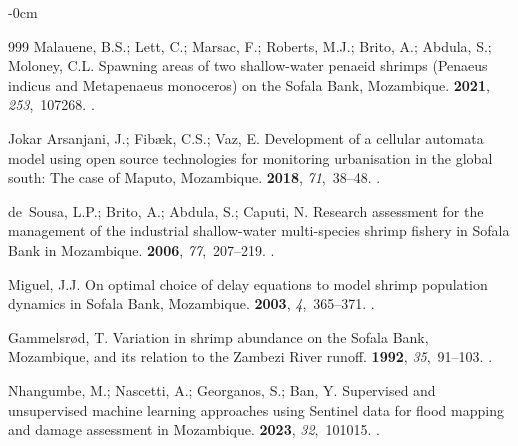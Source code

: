 \documentclass[coasts,article,accept,pdftex,oneauthor]{Definitions/mdpi}
\begin{document}
\begin{adjustwidth}{-\extralength}{0cm}
\begin{thebibliography}{999}
Malauene, B.S.; Lett, C.; Marsac, F.; Roberts, M.J.; Brito, A.; Abdula, S.;
  Moloney, C.L.
\newblock Spawning areas of two shallow-water penaeid shrimps (Penaeus indicus
  and Metapenaeus monoceros) on the Sofala Bank, Mozambique.
 {\bf 2021}, {\em
  253},~107268.
.

{Jokar Arsanjani}, J.; Fibæk, C.S.; Vaz, E.
\newblock Development of a cellular automata model using open source
  technologies for monitoring urbanisation in the global south: The case of
  Maputo, Mozambique.
 {\bf 2018}, {\em 71},~38--48.
.

de~Sousa, L.P.; Brito, A.; Abdula, S.; Caputi, N.
\newblock Research assessment for the management of the industrial
  shallow-water multi-species shrimp fishery in Sofala Bank in Mozambique.
 {\bf 2006}, {\em 77},~207--219.
.

Miguel, J.J.
\newblock On optimal choice of delay equations to model shrimp population
  dynamics in Sofala Bank, Mozambique.
 {\bf 2003}, {\em
  4},~365--371.
.

Gammelsrød, T.
\newblock Variation in shrimp abundance on the Sofala Bank, Mozambique, and its
  relation to the Zambezi River runoff.
 {\bf 1992}, {\em
  35},~91--103.
.

Nhangumbe, M.; Nascetti, A.; Georganos, S.; Ban, Y.
\newblock Supervised and unsupervised machine learning approaches using
  Sentinel data for flood mapping and damage assessment in Mozambique.
 {\bf
  2023}, {\em 32},~101015.
.


\end{thebibliography}
\end{adjustwidth}
\end{document}
